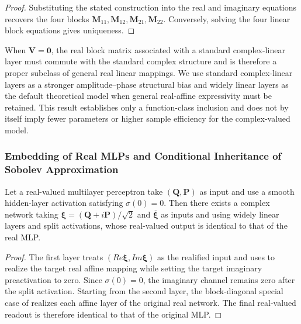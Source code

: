 \begin{proof} Substituting the stated construction into the real and imaginary equations recovers the four blocks \(\mathbf{M}_{11},\mathbf{M}_{12},\mathbf{M}_{21},\mathbf{M}_{22}\). Conversely, solving the four linear block equations gives uniqueness.\end{proof}

When \(\mathbf{V}=\mathbf{0}\), the real block matrix associated with a standard complex-linear layer must commute with the standard complex structure and is therefore a proper subclass of general real linear mappings. We use standard complex-linear layers as a stronger amplitude--phase structural bias and widely linear layers as the default theoretical model when general real-affine expressivity must be retained. This result establishes only a function-class inclusion and does not by itself imply fewer parameters or higher sample efficiency for the complex-valued model.

\subsubsection{Embedding of Real MLPs and Conditional Inheritance of Sobolev Approximation}\label{sec:chnn-4-2-4}

\begin{theorem}\label{thm:real-mlp-embedding}
Let a real-valued multilayer perceptron take \(\left(\mathbf{Q},\mathbf{P}\right)\) as input and use a smooth hidden-layer activation satisfying \(\sigma(0)=0\). Then there exists a complex network taking \(\bm{\xi}=\left(\mathbf{Q}+i\mathbf{P}\right)/\sqrt{2}\) and \(\overline{\bm{\xi}}\) as inputs and using widely linear layers and split activations, whose real-valued output is identical to that of the real MLP.
\end{theorem}

\begin{proof} The first layer treats \(\left(Re\bm{\xi},Im\bm{\xi}\right)\) as the realified input and uses  to realize the target real affine mapping while setting the target imaginary preactivation to zero. Since \(\sigma(0)=0\), the imaginary channel remains zero after the split activation. Starting from the second layer, the block-diagonal special case of  realizes each affine layer of the original real network. The final real-valued readout is therefore identical to that of the original MLP.\end{proof}

